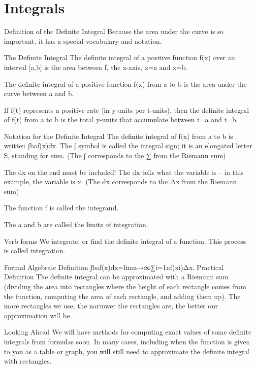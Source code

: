 \section{Integrals}
\label{sec:integrals}
Definition of the Definite Integral
Because the area under the curve is so important, it has a special vocabulary and notation.

The Definite Integral
The definite integral of a positive function f(x) over an interval [a,b] is the area between f, the x-axis, x=a and x=b.

The definite integral of a positive function f(x) from a to b is the area under the curve between a and b.

If f(t) represents a positive rate (in y-units per t-units), then the definite integral of f(t) from a to b is the total y-units that accumulate between t=a and t=b.

Notation for the Definite Integral
The definite integral of f(x) from a to b is written
∫baf(x)dx.
The ∫ symbol is called the integral sign; it is an elongated letter S, standing for sum. (The ∫ corresponds to the ∑ from the Riemann sum)

The dx on the end must be included! The dx tells what the variable is – in this example, the variable is x. (The dx corresponds to the Δx from the Riemann sum)

The function f is called the integrand.

The a and b are called the limits of integration.

Verb forms
We integrate, or find the definite integral of a function. This process is called integration.

Formal Algebraic Definition
∫baf(x)dx=limn→∞∑i=1nf(xi)Δx.
Practical Definition
The definite integral can be approximated with a Riemann sum (dividing the area into rectangles where the height of each rectangle comes from the function, computing the area of each rectangle, and adding them up). The more rectangles we use, the narrower the rectangles are, the better our approximation will be.

Looking Ahead
We will have methods for computing exact values of some definite integrals from formulas soon. In many cases, including when the function is given to you as a table or graph, you will still need to approximate the definite integral with rectangles.

